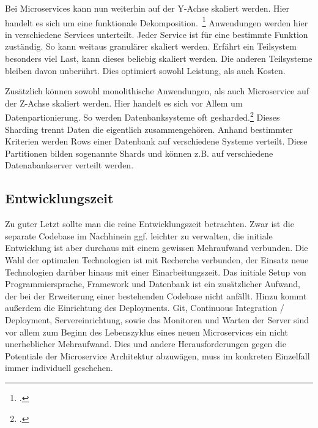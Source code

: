 Bei Microservices kann nun weiterhin auf der Y-Achse skaliert werden. Hier handelt es sich um eine funktionale Dekomposition.~\footcite[][]{abbott2009art} Anwendungen werden hier in verschiedene Services unterteilt. Jeder Service ist für eine bestimmte Funktion zuständig. So kann weitaus granulärer skaliert werden. Erfährt ein Teilsystem besonders viel Last, kann dieses beliebig skaliert werden. Die anderen Teilsysteme bleiben davon unberührt. Dies optimiert sowohl Leistung, als auch Kosten.

Zusätzlich können sowohl monolithische Anwendungen, als auch Microservice auf der Z-Achse skaliert werden. Hier handelt es sich vor Allem um Datenpartionierung. So werden Datenbanksysteme oft gesharded.\footcite[][]{microsoft:sharding} Dieses Sharding trennt Daten die eigentlich zusammengehören. Anhand bestimmter Kriterien werden Rows einer Datenbank auf verschiedene Systeme verteilt. Diese Partitionen bilden sogenannte Shards und können z.B. auf verschiedene Datenabankserver verteilt werden.

\subsection{Entwicklungszeit}
Zu guter Letzt sollte man die reine Entwicklungszeit betrachten. Zwar ist die separate Codebase im Nachhinein ggf. leichter zu verwalten, die initiale Entwicklung ist aber durchaus mit einem gewissen Mehraufwand verbunden. Die Wahl der optimalen Technologien ist mit Recherche verbunden, der Einsatz neue Technologien darüber hinaus mit einer Einarbeitungszeit. Das initiale Setup von Programmiersprache, Framework und Datenbank ist ein zusätzlicher Aufwand, der bei der Erweiterung einer bestehenden Codebase nicht anfällt. Hinzu kommt außerdem die Einrichtung des Deployments. Git, Continuous Integration / Deployment, Servereinrichtung, sowie das Monitoren und Warten der Server sind vor allem zum Beginn des Lebenszyklus eines neuen Microservices ein nicht unerheblicher Mehraufwand. Dies und andere Herausforderungen gegen die Potentiale der Microservice Architektur abzuwägen, muss im konkreten Einzelfall immer individuell geschehen.


